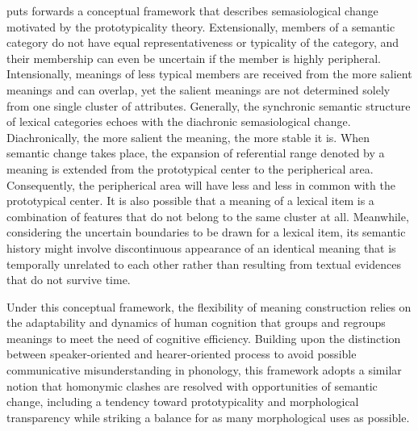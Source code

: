 \textcite{geeraerts1997diachronic} puts forwards a conceptual framework that describes semasiological change motivated by the prototypicality theory. Extensionally, members of a semantic category do not have equal representativeness or typicality of the category, and their membership can even be uncertain if the member is highly peripheral. Intensionally, meanings of less typical members are received from the more salient meanings and can overlap, yet the salient meanings are not determined solely from one single cluster of attributes. Generally, the synchronic semantic structure of lexical categories echoes with the diachronic semasiological change. Diachronically, the more salient the meaning, the more stable it is. When semantic change takes place, the expansion of referential range denoted by a meaning is extended from the prototypical center to the peripherical area. Consequently, the peripherical area will have less and less in common with the prototypical center. It is also possible that a meaning of a lexical item is a combination of features that do not belong to the same cluster at all. Meanwhile, considering the uncertain boundaries to be drawn for a lexical item, its semantic history might involve discontinuous appearance of an identical meaning that is temporally unrelated to each other rather than resulting from textual evidences that do not survive time.

Under this conceptual framework, the flexibility of meaning construction relies on the adaptability and dynamics of human cognition that groups and regroups meanings to meet the need of cognitive efficiency. Building upon the distinction between speaker-oriented and hearer-oriented process to avoid possible communicative misunderstanding in phonology, this framework adopts a similar notion that homonymic clashes are resolved with opportunities of semantic change, including a tendency toward prototypicality and morphological transparency while striking a balance for as many morphological uses as possible.

